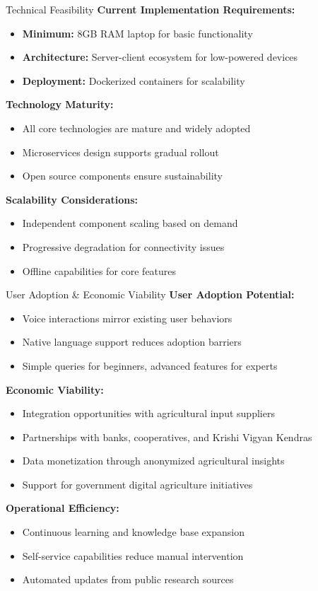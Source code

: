 \documentclass[aspectratio=169]{beamer}
\begin{document}
\begin{frame}{Technical Feasibility}
\textbf{Current Implementation Requirements:}
\begin{itemize}
\item \textbf{Minimum:} 8GB RAM laptop for basic functionality
\item \textbf{Architecture:} Server-client ecosystem for low-powered devices
\item \textbf{Deployment:} Dockerized containers for scalability
\end{itemize}

\textbf{Technology Maturity:}
\begin{itemize}
\item All core technologies are mature and widely adopted
\item Microservices design supports gradual rollout
\item Open source components ensure sustainability
\end{itemize}

\textbf{Scalability Considerations:}
\begin{itemize}
\item Independent component scaling based on demand
\item Progressive degradation for connectivity issues
\item Offline capabilities for core features
\end{itemize}
\end{frame}

\begin{frame}{User Adoption \& Economic Viability}
\textbf{User Adoption Potential:}
\begin{itemize}
\item Voice interactions mirror existing user behaviors
\item Native language support reduces adoption barriers
\item Simple queries for beginners, advanced features for experts
\end{itemize}

\textbf{Economic Viability:}
\begin{itemize}
\item Integration opportunities with agricultural input suppliers
\item Partnerships with banks, cooperatives, and Krishi Vigyan Kendras
\item Data monetization through anonymized agricultural insights
\item Support for government digital agriculture initiatives
\end{itemize}

\textbf{Operational Efficiency:}
\begin{itemize}
\item Continuous learning and knowledge base expansion
\item Self-service capabilities reduce manual intervention
\item Automated updates from public research sources
\end{itemize}
\end{frame}
\end{document}
